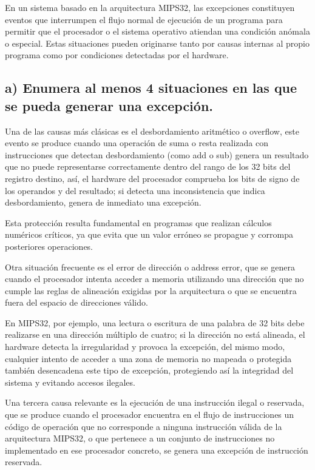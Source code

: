 \documentclass[12pt, letterpaper]{article}
\begin{document}
En un sistema basado en la arquitectura MIPS32, las excepciones constituyen eventos que interrumpen el flujo normal de ejecución de un programa para permitir que el procesador o el sistema operativo atiendan una condición anómala o especial. Estas situaciones pueden originarse tanto por causas internas al propio programa como por condiciones detectadas por el hardware. 
 \subsection*{a) Enumera al menos 4 situaciones en las que se pueda generar una excepción.}

 Una de las causas más clásicas es el desbordamiento aritmético o overflow, este evento se produce cuando una operación de suma o resta realizada con instrucciones que detectan desbordamiento (como add o sub) genera un resultado que no puede representarse correctamente dentro del rango de los 32 bits del registro destino, así, el hardware del procesador comprueba los bits de signo de los operandos y del resultado; si detecta una inconsistencia que indica desbordamiento, genera de inmediato una excepción. 

 Esta protección resulta fundamental en programas que realizan cálculos numéricos críticos, ya que evita que un valor erróneo se propague y corrompa posteriores operaciones.

 Otra situación frecuente es el error de dirección o address error, que se genera cuando el procesador intenta acceder a memoria utilizando una dirección que no cumple las reglas de alineación exigidas por la arquitectura o que se encuentra fuera del espacio de direcciones válido.

 En MIPS32, por ejemplo, una lectura o escritura de una palabra de 32 bits debe realizarse en una dirección múltiplo de cuatro; si la dirección no está alineada, el hardware detecta la irregularidad y provoca la excepción, del mismo modo, cualquier intento de acceder a una zona de memoria no mapeada o protegida también desencadena este tipo de excepción, protegiendo así la integridad del sistema y evitando accesos ilegales.

 Una tercera causa relevante es la ejecución de una instrucción ilegal o reservada, que se produce cuando el procesador encuentra en el flujo de instrucciones un código de operación que no corresponde a ninguna instrucción válida de la arquitectura MIPS32, o que pertenece a un conjunto de instrucciones no implementado en ese procesador concreto, se genera una excepción de instrucción reservada. 
\end{document}
